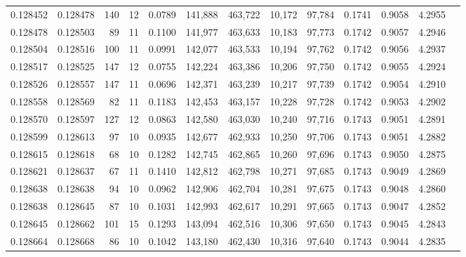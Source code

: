 \begin{tabular}{rrrrrrrrrrrrr}
0.128452 & 0.128478 &   140 &  12 &                                     0.0789 & 141,888 & 463,722 &  10,172 &  97,784 & 0.1741 & 0.9058 & 4.2955 \\
0.128478 & 0.128503 &    89 &  11 &                                     0.1100 & 141,977 & 463,633 &  10,183 &  97,773 & 0.1742 & 0.9057 & 4.2946 \\
0.128504 & 0.128516 &   100 &  11 &                                     0.0991 & 142,077 & 463,533 &  10,194 &  97,762 & 0.1742 & 0.9056 & 4.2937 \\
0.128517 & 0.128525 &   147 &  12 &                                     0.0755 & 142,224 & 463,386 &  10,206 &  97,750 & 0.1742 & 0.9055 & 4.2924 \\
0.128526 & 0.128557 &   147 &  11 &                                     0.0696 & 142,371 & 463,239 &  10,217 &  97,739 & 0.1742 & 0.9054 & 4.2910 \\
0.128558 & 0.128569 &    82 &  11 &                                     0.1183 & 142,453 & 463,157 &  10,228 &  97,728 & 0.1742 & 0.9053 & 4.2902 \\
0.128570 & 0.128597 &   127 &  12 &                                     0.0863 & 142,580 & 463,030 &  10,240 &  97,716 & 0.1743 & 0.9051 & 4.2891 \\
0.128599 & 0.128613 &    97 &  10 &                                     0.0935 & 142,677 & 462,933 &  10,250 &  97,706 & 0.1743 & 0.9051 & 4.2882 \\
0.128615 & 0.128618 &    68 &  10 &                                     0.1282 & 142,745 & 462,865 &  10,260 &  97,696 & 0.1743 & 0.9050 & 4.2875 \\
0.128621 & 0.128637 &    67 &  11 &                                     0.1410 & 142,812 & 462,798 &  10,271 &  97,685 & 0.1743 & 0.9049 & 4.2869 \\
0.128638 & 0.128638 &    94 &  10 &                                     0.0962 & 142,906 & 462,704 &  10,281 &  97,675 & 0.1743 & 0.9048 & 4.2860 \\
0.128638 & 0.128645 &    87 &  10 &                                     0.1031 & 142,993 & 462,617 &  10,291 &  97,665 & 0.1743 & 0.9047 & 4.2852 \\
0.128645 & 0.128662 &   101 &  15 &                                     0.1293 & 143,094 & 462,516 &  10,306 &  97,650 & 0.1743 & 0.9045 & 4.2843 \\
0.128664 & 0.128668 &    86 &  10 &                                     0.1042 & 143,180 & 462,430 &  10,316 &  97,640 & 0.1743 & 0.9044 & 4.2835 \\

\end{tabular}
